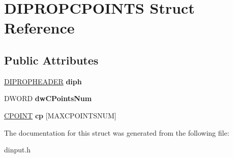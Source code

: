 \hypertarget{struct_d_i_p_r_o_p_c_p_o_i_n_t_s}{\section{D\-I\-P\-R\-O\-P\-C\-P\-O\-I\-N\-T\-S Struct Reference}
\label{struct_d_i_p_r_o_p_c_p_o_i_n_t_s}
}
\subsection*{Public Attributes}
\begin{DoxyCompactItemize}
\item 
\hypertarget{struct_d_i_p_r_o_p_c_p_o_i_n_t_s_a16e738b65e34c6a45a7b134db70a93ba}{\hyperlink{struct_d_i_p_r_o_p_h_e_a_d_e_r}{D\-I\-P\-R\-O\-P\-H\-E\-A\-D\-E\-R} {\bfseries diph}}\label{struct_d_i_p_r_o_p_c_p_o_i_n_t_s_a16e738b65e34c6a45a7b134db70a93ba}

\item 
\hypertarget{struct_d_i_p_r_o_p_c_p_o_i_n_t_s_a2e16ce114a7b1f8cf2466152f5381dcd}{D\-W\-O\-R\-D {\bfseries dw\-C\-Points\-Num}}\label{struct_d_i_p_r_o_p_c_p_o_i_n_t_s_a2e16ce114a7b1f8cf2466152f5381dcd}

\item 
\hypertarget{struct_d_i_p_r_o_p_c_p_o_i_n_t_s_a71c56087ba629b6ac0d043126b9e89bb}{\hyperlink{struct___c_p_o_i_n_t}{C\-P\-O\-I\-N\-T} {\bfseries cp} \mbox{[}M\-A\-X\-C\-P\-O\-I\-N\-T\-S\-N\-U\-M\mbox{]}}\label{struct_d_i_p_r_o_p_c_p_o_i_n_t_s_a71c56087ba629b6ac0d043126b9e89bb}

\end{DoxyCompactItemize}


The documentation for this struct was generated from the following file\-:\begin{DoxyCompactItemize}
\item 
dinput.\-h\end{DoxyCompactItemize}
